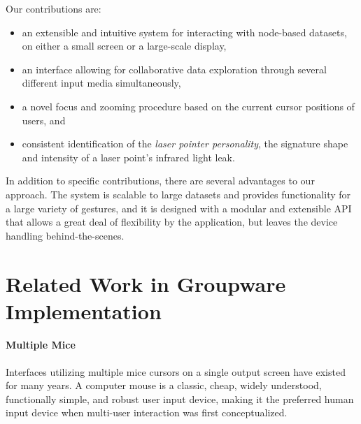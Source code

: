 \documentclass[runningheads,a4paper]{llncs}
\begin{document}
\vspace{0.1in}

\noindent
Our contributions are:

\begin{itemize}
 \item an extensible and intuitive system for interacting with node-based datasets, on either a small screen or a large-scale display,
 \item an interface allowing for collaborative data exploration through several different input media simultaneously,
 \item a novel focus and zooming procedure based on the current cursor positions of users, and
 \item consistent identification of the \emph{laser pointer personality}, the signature shape and intensity of a laser point's infrared light leak.
\end{itemize}

In addition to specific contributions, there are several advantages to our approach. 
The system is scalable to large datasets
and provides functionality for a large variety of gestures,
and it is 
designed with a modular and extensible API that allows a great deal of flexibility by the application,
but leaves the device handling behind-the-scenes. 


\section{Related Work in Groupware Implementation}


\paragraph{\bf Multiple Mice}

Interfaces utilizing multiple mice cursors on a single output screen
have existed for many years.  A computer mouse is a classic, cheap,
widely understood, functionally simple, and robust user input device,
making it the preferred human input device when multi-user interaction
was first conceptualized.
 
\end{document}

